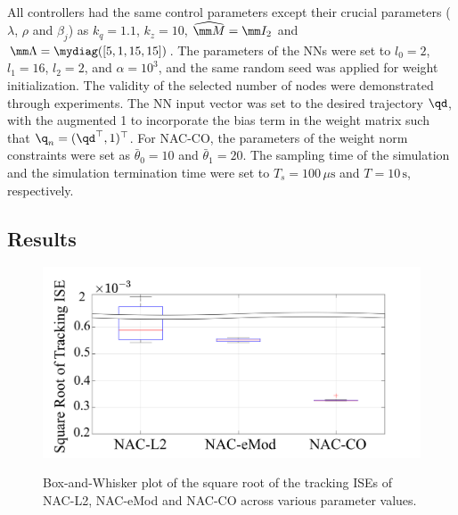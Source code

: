 \documentclass[letterpaper, 10 pt, conference]{ieeeconf}  %
\begin{document}
All controllers had the same control parameters except their crucial parameters (\ie $\lambda$, $\rho$ and $\beta_j$) as $k_q=1.1$, $k_z=10$, $\widehat{\mm M}=\mm I_2$ and $\mm \Lambda=\mydiag([5,1,15,15])$.
The parameters of the NNs were set to $l_0=2$, $l_1=16$, $l_2=2$, and $\alpha=10^3$, and the same random seed was applied for weight initialization.
The validity of the selected number of nodes were demonstrated through experiments.
The NN input vector was set to the desired trajectory $\qd$, with the augmented 1 to incorporate the bias term in the weight matrix such that $\q_{n}=(\qd^\top ,1)^\top $.
For NAC-CO, the parameters of the weight norm constraints were set as $\bar\theta_0=10$ and $\bar\theta_1=20$.
The sampling time of the simulation and the simulation termination time were set to $T_s=100\,\mu\mathrm{s}$ and $T=10\,\mathrm{s}$, respectively.

\subsection{Results}

\begin{figure}[!t]      
    \centering
    {\includegraphics[width=.85\linewidth]{fig/BoxWhisker.drawio.png}}
\caption{Box-and-Whisker plot of the square root of the tracking ISEs of NAC-L2, NAC-eMod and NAC-CO across various parameter values.}
    \label{fig: Box-beard plot}
\end{figure}
\end{document}
